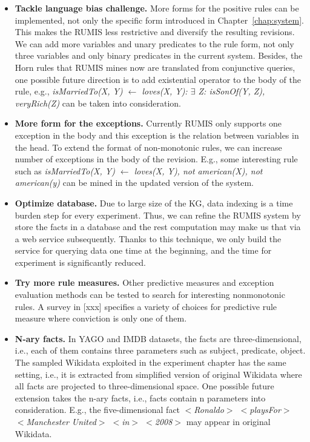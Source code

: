 \begin{itemize}
\item \textbf{Tackle language bias challenge.} More forms for the positive rules can be implemented, not only the specific form introduced in Chapter~\ref{chap:system}. This makes the RUMIS less restrictive and diversify the resulting revisions. We can add more variables and unary predicates to the rule form, not only three variables and only binary predicates in the current system. Besides, the Horn rules that RUMIS mines now are translated from conjunctive queries, one possible future direction is to add existential operator to the body of the rule, e.g., \textit{isMarriedTo(X, Y) $\leftarrow$ loves(X, Y): $\exists$ Z: isSonOf(Y, Z), veryRich(Z)} can be taken into consideration.
\item \textbf{More form for the exceptions.} Currently RUMIS only supports one exception in the body and this exception is the relation between variables in the head. To extend the format of non-monotonic rules, we can increase number of exceptions in the body of the revision. E.g., some interesting rule such as \textit{isMarriedTo(X, Y) $\leftarrow$ loves(X, Y), not american(X), not american(y)} can be mined in the updated version of the system.
\item \textbf{Optimize database.} Due to large size of the KG, data indexing is a time burden step for every experiment. Thus, we can refine the RUMIS system by store the facts in a database and the rest computation may make us that via a web service subsequently. Thanks to this technique, we only build the service for querying data one time at the beginning, and the time for experiment is significantly reduced.
\item \textbf{Try more rule measures.} Other predictive measures and exception evaluation methods can be tested to search for interesting nonmonotonic rules. A survey in [xxx] specifies a variety of choices for predictive rule measure where conviction is only one of them.
\item \textbf{N-ary facts.} In YAGO and IMDB datasets, the facts are three-dimensional, i.e., each of them contains three parameters such as subject, predicate, object. The sampled Wikidata exploited in the experiment chapter has the same setting, i.e., it is extracted from simplified version of original Wikidata where all facts are projected to three-dimensional space. One possible future extension takes the n-ary facts, i.e., facts contain n parameters into consideration. E.g., the five-dimensional fact \textit{$<$Ronaldo$>$ $<$playsFor$>$ $<$Manchester United$>$ $<$in$>$ $<$2008$>$} may appear in original Wikidata.

\end{itemize}
